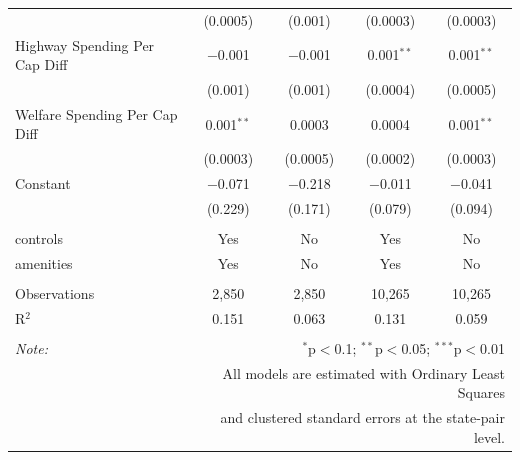 \documentclass[12pt,a4paper]{article}
\begin{document}
\begin{table}[!htbp]
\begin{tabular}{@{\extracolsep{5pt}}lcccc}
  & (0.0005) & (0.001) & (0.0003) & (0.0003) \\ 
  Highway Spending Per Cap Diff & $-$0.001 & $-$0.001 & 0.001$^{**}$ & 0.001$^{**}$ \\ 
  & (0.001) & (0.001) & (0.0004) & (0.0005) \\ 
  Welfare Spending Per Cap Diff & 0.001$^{**}$ & 0.0003 & 0.0004 & 0.001$^{**}$ \\ 
  & (0.0003) & (0.0005) & (0.0002) & (0.0003) \\ 
  Constant & $-$0.071 & $-$0.218 & $-$0.011 & $-$0.041 \\ 
  & (0.229) & (0.171) & (0.079) & (0.094) \\ 
 \hline \\[-1.8ex] 
controls & Yes & No & Yes & No \\ 
amenities & Yes & No & Yes & No \\ 
\hline \\[-1.8ex] 
Observations & 2,850 & 2,850 & 10,265 & 10,265 \\ 
R$^{2}$ & 0.151 & 0.063 & 0.131 & 0.059 \\ 
\hline 
\hline \\[-1.8ex] 
\textit{Note:}  & \multicolumn{4}{r}{$^{*}$p$<$0.1; $^{**}$p$<$0.05; $^{***}$p$<$0.01} \\ 
 & \multicolumn{4}{r}{All models are estimated with Ordinary Least Squares} \\ 
 & \multicolumn{4}{r}{and clustered standard errors at the state-pair level.} \\ 
\end{tabular} 
\end{table} 
\end{document}
